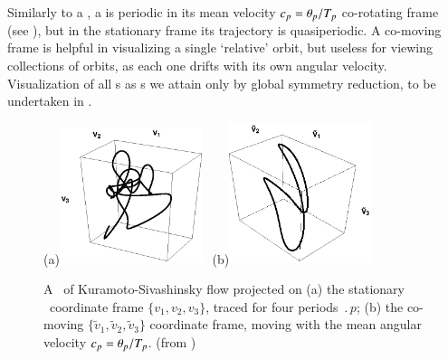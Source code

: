 Similarly to a \reqv, a \emph{\rpo} is periodic in its
mean velocity $c_p={\bf \theta}_p/{T_{p}}$ co-rotating
frame (see ), but in the
stationary frame its trajectory is quasiperiodic.
A co-moving
frame is helpful in visualizing a single `relative' orbit,
but useless for viewing collections of orbits, as each one
drifts with its own angular velocity. Visualization of all
\rpo s as \po s we attain only by global symmetry reduction,
to be undertaken in .

%
\begin{figure}[ht]
(a)\includegraphics[width=0.37\textwidth, clip=true]
                    {../figs/ks22rpo033.50_04.045E2.eps}
~(b)\includegraphics[width=0.37\textwidth, clip=true]
                     {../figs/ks22rpo033.50_04.045E2CM.eps}
\caption{
 A \rpo\ of Kuramoto-Sivashinsky flow projected on
 (a) the stationary \statesp\ coordinate frame
 $\{v_1,v_2,v_3\}$, traced for four periods
 $\period{p}$;
 (b) the co-moving $\{\tilde{v}_1,\tilde{v}_2,\tilde{v}_3\}$
 coordinate frame, moving with the mean angular velocity
 $c_p={\bf \theta}_p/{T_{p}}$.
\hfill (from )
}
\label{f:MeanVelocityFrame}
\end{figure}


